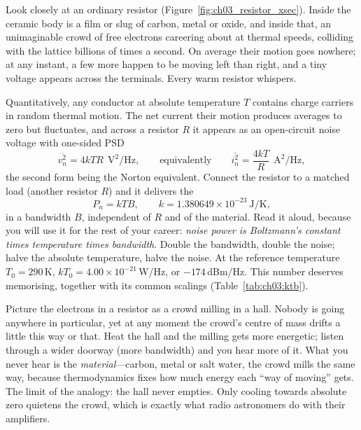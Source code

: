 Look closely at an ordinary resistor (Figure~\ref{fig:ch03_resistor_xsec}). Inside the ceramic body
is a film or slug of carbon, metal or oxide, and inside that, an unimaginable crowd of free electrons
careering about at thermal speeds, colliding with the lattice billions of times a second. On average
their motion goes nowhere; at any instant, a few more happen to be moving left than right, and a tiny
voltage appears across the terminals. Every warm resistor whispers.

Quantitatively, any conductor at absolute temperature $T$ contains charge carriers in random thermal
motion. The net current their motion produces averages to zero but fluctuates, and across a resistor
$R$ it appears as an open-circuit noise voltage with one-sided PSD
\begin{equation}
\overline{v_n^2}=4kTR\ \ \mathrm{V^2/Hz},\qquad\text{equivalently}\qquad \overline{i_n^2}=\frac{4kT}{R}\ \ \mathrm{A^2/Hz},
\label{eq:ch03:johnson}
\end{equation}
the second form being the Norton equivalent. Connect the resistor to a matched load (another resistor
$R$) and it delivers the 
\begin{equation}
P_n=kTB,\qquad k=1.380649\times10^{-23}\ \mathrm{J/K},
\label{eq:ch03:ktb}
\end{equation}
in a bandwidth $B$, independent of $R$ and of the material. Read it aloud, because you will use it
for the rest of your career: \emph{noise power is Boltzmann's constant times temperature times
bandwidth}. Double the bandwidth, double the noise; halve the absolute temperature, halve the noise.
At the reference temperature $T_0=290$\,K, $kT_0=4.00\times10^{-21}$\,W/Hz, or $-174$\,dBm/Hz. This
number deserves memorising, together with its common scalings (Table~\ref{tab:ch03:ktb}).

\begin{analogy}
Picture the electrons in a resistor as a crowd milling in a hall. Nobody is going anywhere in
particular, yet at any moment the crowd's centre of mass drifts a little this way or that. Heat the
hall and the milling gets more energetic; listen through a wider doorway (more bandwidth) and you hear
more of it. What you never hear is the \emph{material}---carbon, metal or salt water, the crowd mills
the same way, because thermodynamics fixes how much energy each ``way of moving'' gets. The limit of
the analogy: the hall never empties. Only cooling towards absolute zero quietens the crowd, which is
exactly what radio astronomers do with their amplifiers.
\end{analogy}

